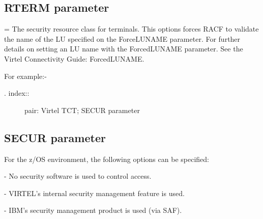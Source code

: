 \documentclass[letterpaper,10pt,english]{sphinxmanual}
\begin{document}
\subsection{RTERM parameter}
\label{\detokenize{Installation_Guide:rterm-parameter}}
\begin{sphinxVerbatim}[commandchars=\\\{\}]
\end{sphinxVerbatim}

 = The security resource class for terminals. This options forces RACF to validate the name of the LU specified on the ForceLUNAME parameter. For further details on setting an LU name with the ForcedLUNAME parameter. See the Virtel Connectivity Guide: ForcedLUNAME.

For example:-

\begin{sphinxVerbatim}[commandchars=\\\{\}]
\end{sphinxVerbatim}
\begin{description}
\item[{. index::}] \leavevmode
pair: Virtel TCT; SECUR parameter

\end{description}


\subsection{SECUR parameter}
\label{\detokenize{Installation_Guide:secur-parameter}}
\begin{sphinxVerbatim}[commandchars=\\\{\}]
 
\end{sphinxVerbatim}

For the z/OS environment, the following options can be specified:

 - No security software is used to control access.

 - VIRTEL’s internal security management feature is used.

 - IBM’s security management product is used (via SAF).
\end{document}
